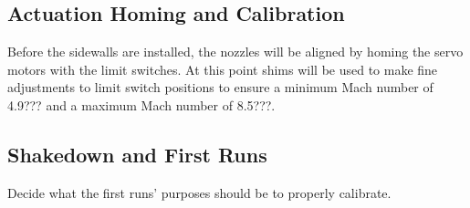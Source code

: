\subsection{Actuation Homing and Calibration}

Before the sidewalls are installed, the nozzles will be aligned by homing the servo motors with the limit switches. At this point shims will be used to make fine adjustments to limit switch positions to ensure a minimum Mach number of 4.9??? and a maximum Mach number of 8.5???.

\subsection{Shakedown and First Runs}

Decide what the first runs' purposes should be to properly calibrate.

